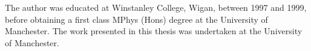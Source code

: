 The author was educated at Winstanley College, Wigan, between 1997 and 1999, before obtaining a first class MPhys (Hons) degree at the University of Manchester. The work presented in this thesis was undertaken at the University of Manchester.
